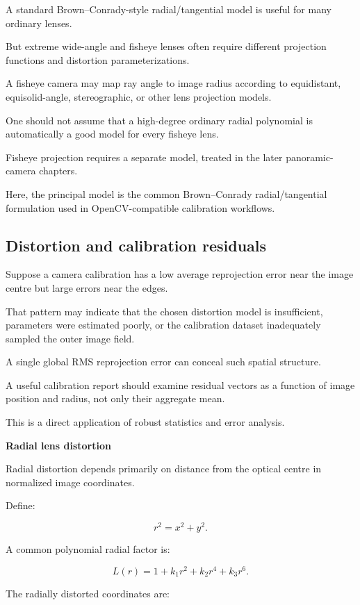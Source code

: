 A standard Brown--Conrady-style radial/tangential model is useful for many ordinary lenses.

But extreme wide-angle and fisheye lenses often require different projection functions and distortion parameterizations.

A fisheye camera may map ray angle to image radius according to equidistant, equisolid-angle, stereographic, or other lens projection models.

One should not assume that a high-degree ordinary radial polynomial is automatically a good model for every fisheye lens.

Fisheye projection requires a separate model, treated in the later panoramic-camera chapters.

Here, the principal model is the common Brown--Conrady radial/tangential formulation used in OpenCV-compatible calibration workflows. 

\subsection{Distortion and calibration residuals}\label{02-foundations-ii-ch035-distortion-and-calibration-residuals}

Suppose a camera calibration has a low average reprojection error near the image centre but large errors near the edges.

That pattern may indicate that the chosen distortion model is insufficient, parameters were estimated poorly, or the calibration dataset inadequately sampled the outer image field.

A single global RMS reprojection error can conceal such spatial structure.

A useful calibration report should examine residual vectors as a function of image position and radius, not only their aggregate mean.

This is a direct application of robust statistics and error analysis.

\textbf{Radial lens distortion}

Radial distortion depends primarily on distance from the optical centre in normalized image coordinates.

Define:

\[
 \boxed{ r^2=x^2+y^2 }.
\]

A common polynomial radial factor is:

\[
 \boxed{ L(r)= 1+k_1r^2+k_2r^4+k_3r^6 }.
\]

The radially distorted coordinates are:

